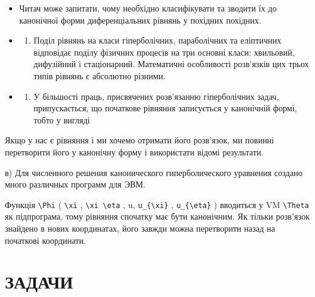 \documentclass[
  ukrainian,
]{article}
\providecommand{\tightlist}{%
  \setlength{\itemsep}{0pt}\setlength{\parskip}{0pt}}
\begin{document}
\begin{itemize}
\item
  Читач може запитати, чому необхідно класифікувати та зводити їх до
  канонічної форми диференціальних рівнянь у похідних похідних.
\item
  \begin{enumerate}
  \def\labelenumi{\alph{enumi})}
  \tightlist
  \item
    Поділ рівнянь на класи гіперболічних, параболічних та еліптичних
    відповідає поділу фізичних процесів на три основні класи: хвильовий,
    дифузійний і стаціонарний. Математичні особливості розв'язків цих
    трьох типів рівнянь є абсолютно різними.
  \end{enumerate}
\item
  \begin{enumerate}
  \def\labelenumi{\alph{enumi})}
  \setcounter{enumi}{1}
  \tightlist
  \item
    У більшості праць, присвячених розв'язанню гіперболічних задач,
    припускається, що початкове рівняння записується у канонічній формі,
    тобто у вигляді
  \end{enumerate}
\end{itemize}

Якщо у нас є рівняння і ми хочемо отримати його розв'язок, ми повинні
перетворити його у канонічну форму і використати відомі результати.

в) Для численного решения канонического гиперболического уравнения
создано много различных программ для ЭВМ.

Функція \texttt{\textbackslash{}Phi} ( \texttt{\textbackslash{}xi} ,
\texttt{\textbackslash{}xi\ \textbackslash{}eta} , u,
\texttt{u\_\{\textbackslash{}xi\}} , \texttt{u\_\{\textbackslash{}eta\}}
) вводиться у VM \texttt{\textbackslash{}Theta} як підпрограма, тому
рівняння спочатку має бути канонічним. Як тільки розв'язок знайдено в
нових координатах, його завжди можна перетворити назад на початкові
координати.

\section{ЗАДАЧИ}\label{ux437ux430ux434ux430ux447ux438-1}
\end{document}

